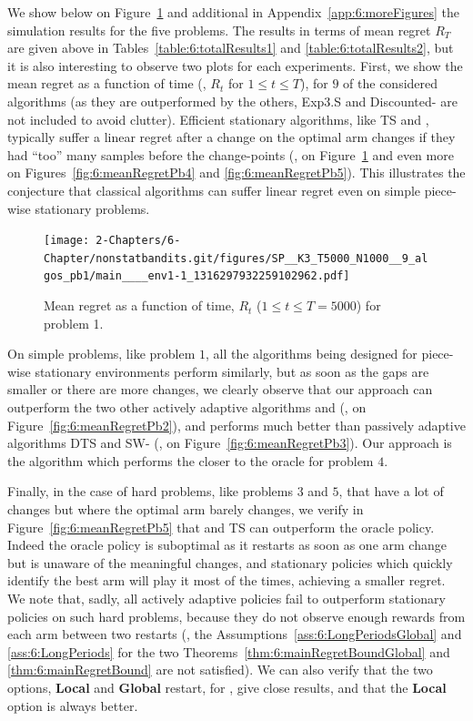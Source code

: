 We show below on Figure~\ref{fig:6:meanRegretPb1} and additional in Appendix~\ref{app:6:moreFigures} the simulation results for the five problems.
The results in terms of mean regret $R_T$ are given above in Tables~\ref{table:6:totalResults1} and \ref{table:6:totalResults2}, but it is also interesting to observe two plots for each experiments.
%
First, we show the mean regret as a function of time (\ie, $R_t$ for $1 \leq t \leq T$), for $9$ of the considered algorithms (as they are outperformed by the others, Exp3.S and Discounted-\klUCB{} are not included to avoid clutter).
%
Efficient stationary algorithms, like TS and \klUCB, typically suffer a linear regret after a change on the optimal arm changes if they had ``too'' many samples before the change-points (\eg, on Figure~\ref{fig:6:meanRegretPb1} and even more on Figures~\ref{fig:6:meanRegretPb4} and \ref{fig:6:meanRegretPb5}).
This illustrates the conjecture that classical algorithms can suffer linear regret even on simple piece-wise stationary problems.


\begin{figure}[h!]  %
    \centering
    \texttt{[image: 2-Chapters/6-Chapter/nonstatbandits.git/figures/SP\_\_K3\_T5000\_N1000\_\_9\_algos\_pb1/main\_\_\_\_env1-1\_1316297932259102962.pdf]}
    \caption{Mean regret as a function of time, $R_t$ ($1 \leq t \leq T = 5000$) for problem 1.}
    \label{fig:6:meanRegretPb1}
\end{figure}

On simple problems, like problem $1$, all the algorithms being designed for piece-wise stationary environments perform similarly, but as soon as the gaps are smaller or there are more changes, we clearly observe that our approach \GLRklUCB{} can outperform the two other actively adaptive algorithms \CUSUMklUCB{} and \MklUCB{} (\eg, on Figure~\ref{fig:6:meanRegretPb2}), and performs much better than passively adaptive algorithms DTS and SW-\klUCB{}  (\eg, on Figure~\ref{fig:6:meanRegretPb3}).
Our approach is the algorithm which performs the closer to the oracle for problem $4$.

Finally, in the case of hard problems, like problems $3$ and $5$, that have a lot of changes but where the optimal arm barely changes, we verify in Figure~\ref{fig:6:meanRegretPb5} that \klUCB{} and TS can outperform the oracle policy.
Indeed the oracle policy is suboptimal as it restarts as soon as one arm change but is unaware of the meaningful changes, and stationary policies which quickly identify the best arm will play it most of the times, achieving a smaller regret.
We note that, sadly, all actively adaptive policies fail to outperform stationary policies on such hard problems, because they do not observe enough rewards from each arm between two restarts (\ie, the Assumptions~\ref{ass:6:LongPeriodsGlobal} and \ref{ass:6:LongPeriods} for the two Theorems~\ref{thm:6:mainRegretBoundGlobal} and \ref{thm:6:mainRegretBound} are not satisfied).
We can also verify that the two options, \textbf{Local} and \textbf{Global} restart, for \GLRklUCB, give close results, and that the \textbf{Local} option is always better.


